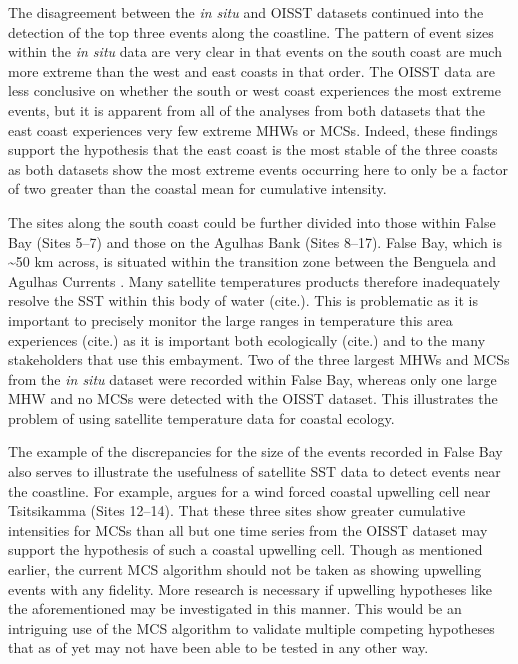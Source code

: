 \documentclass[a4paper,10pt,review]{elsarticle}
\begin{document}
The disagreement between the \emph{in situ} and OISST datasets continued into the detection of the top three events along the coastline. The pattern of event sizes within the \emph{in situ} data are very clear in that events on the south coast are much more extreme than the west and east coasts in that order. The OISST data are less conclusive on whether the south or west coast experiences the most extreme events, but it is apparent from all of the analyses from both datasets that the east coast experiences very few extreme MHWs or MCSs. Indeed, these findings support the hypothesis that the east coast is the most stable of the three coasts as both datasets show the most extreme events occurring here to only be a factor of two greater than the coastal mean for cumulative intensity.

The sites along the south coast could be further divided into those within False Bay (Sites 5--7) and those on the Agulhas Bank (Sites 8--17). False Bay, which is \textasciitilde 50 km across, is situated within the transition zone between the Benguela and Agulhas Currents \citep{Smit2013}. Many satellite temperatures products therefore inadequately resolve the SST within this body of water  (cite.). This is problematic as it is important to precisely monitor the large ranges in temperature this area experiences (cite.) as it is important both ecologically (cite.) and to the many stakeholders that use this embayment. Two of the three largest MHWs and MCSs from the \emph{in situ} dataset were recorded within False Bay, whereas only one large MHW and no MCSs were detected with the OISST dataset. This illustrates the problem of using satellite temperature data for coastal ecology.

The example of the discrepancies for the size of the events recorded in False Bay also serves to illustrate the usefulness of satellite SST data to detect events near the coastline. For example, \citet{Roberts2005} argues for a wind forced coastal upwelling cell near Tsitsikamma (Sites 12--14). That these three sites show greater cumulative intensities for MCSs than all but one time series from the OISST dataset may support the hypothesis of such a coastal upwelling cell. Though as mentioned earlier, the current MCS algorithm should not be taken as showing upwelling events with any fidelity. More research is necessary if upwelling hypotheses like the aforementioned may be investigated in this manner. This would be an intriguing use of the MCS algorithm to validate multiple competing hypotheses that as of yet may not have been able to be tested in any other way.
\end{document}
